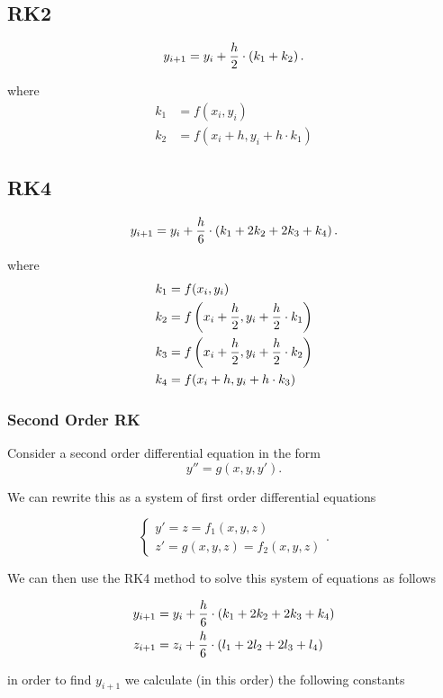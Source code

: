 \documentclass{report}
\begin{document}
\subsection{RK2}

\[
	y_{i+1} = y_i + \frac{h}{2}\cdot\left(k_1 + k_2\right)
	.\]

where
\begin{align*}
	k_1 & = f(x_i,y_i)                  \\
	k_2 & = f(x_i + h,y_i + h\cdot k_1)
\end{align*}

\subsection{RK4}

\[
	y_{i+1} = y_i + \frac{h}{6}\cdot\left(k_1 + 2k_2 + 2k_3 + k_4\right)
	.\]

where
\begin{align*}
	k_1 & = f(x_i,y_i)                                            \\
	k_2 & = f\left(x_i + \frac{h}{2},y_i + \frac{h}{2}\cdot k_1\right) \\
	k_3 & = f\left(x_i + \frac{h}{2},y_i + \frac{h}{2}\cdot k_2\right) \\
	k_4 & = f(x_i + h,y_i + h\cdot k_3)
\end{align*}

\subsubsection{Second Order RK}

Consider a second order differential equation in the form
\[
	y'' = g(x,y,y')
	.\]

We can rewrite this as a system of first order differential equations

\[
	\begin{cases}
		y' = z = f_1(x,y,z) \\
		z' = g(x,y,z) = f_2(x,y,z)
	\end{cases}
	.\]

We can then use the RK4 method to solve this system of equations as follows

\begin{align*}
	y_{i+1} & = y_i + \frac{h}{6}\cdot\left(k_1 + 2k_2 + 2k_3 + k_4\right) \\
	z_{i+1} & = z_i + \frac{h}{6}\cdot\left(l_1 + 2l_2 + 2l_3 + l_4\right)
\end{align*}

in order to find $y_{i+1}$ we calculate (in this order) the following constants
\end{document}
